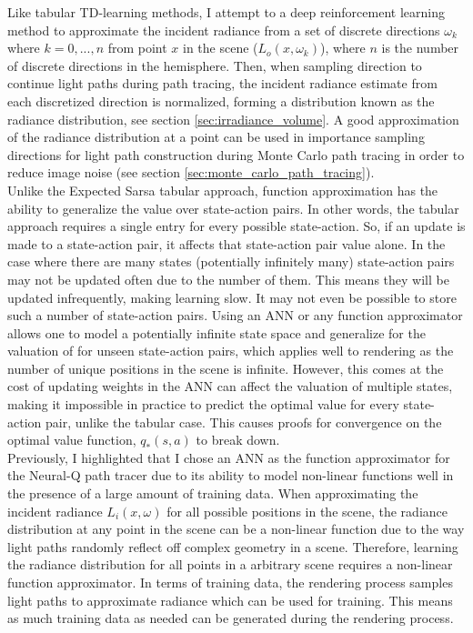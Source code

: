 \documentclass[../dissertation.tex]{subfiles}
\begin{document}
Like tabular TD-learning methods, I attempt to a deep reinforcement learning method to approximate the incident radiance from a set of discrete directions $\omega_k$ where $k = 0,..., n$ from point $x$ in the scene ($L_o(x, \omega_k)$), where $n$ is the number of discrete directions in the hemisphere. Then, when sampling direction to continue light paths during path tracing, the incident radiance estimate from each discretized direction is normalized, forming a distribution known as the radiance distribution, see section \ref{sec:irradiance_volume}. A good approximation of the radiance distribution at a point can be used in importance sampling directions for light path construction during Monte Carlo path tracing in order to reduce image noise (see section \ref{sec:monte_carlo_path_tracing}).\\

Unlike the Expected Sarsa tabular approach, function approximation has the ability to generalize the value over state-action pairs. In other words, the tabular approach requires a single entry for every possible state-action. So, if an update is made to a state-action pair, it affects that state-action pair value alone. In the case where there are many states (potentially infinitely many) state-action pairs may not be updated often due to the number of them. This means they will be updated infrequently, making learning slow. It may not even be possible to store such a number of state-action pairs. Using an ANN or any function approximator allows one to model a potentially infinite state space and generalize for the valuation of for unseen state-action pairs, which applies well to rendering as the number of unique positions in the scene is infinite. However, this comes at the cost of updating weights in the ANN can affect the valuation of multiple states, making it impossible in practice to predict the optimal value for every state-action pair, unlike the tabular case. This causes proofs for convergence on the optimal value function, $q_*(s,a)$ to break down.\\

Previously, I highlighted that I chose an ANN as the function approximator for the Neural-Q path tracer due to its ability to model non-linear functions well in the presence of a large amount of training data. When approximating the incident radiance $L_i(x, \omega)$ for all possible positions in the scene, the radiance distribution at any point in the scene can be a non-linear function due to the way light paths randomly reflect off complex geometry in a scene. Therefore, learning the radiance distribution for all points in a arbitrary scene requires a non-linear function approximator. In terms of training data, the rendering process samples light paths to approximate radiance which can be used for training. This means as much training data as needed can be generated during the rendering process.\\
\end{document}
